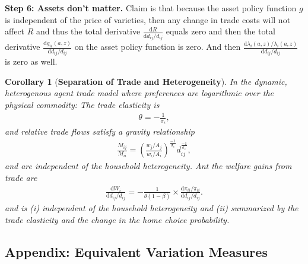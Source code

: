 \documentclass[12pt,pdftex]{article}
\newtheorem{corr}{Corollary}
\begin{document}
\begin{onehalfspacing}
\textbf{Step 6: Assets don't matter.} Claim is that because the asset policy function $g$ is independent of the price of varieties, then any change in trade costs will not affect $R$ and thus the total derivative $\frac{\mathrm{d} R}{\mathrm{d} d_{ij} / d_{ij}}$ equals zero and then the total derivative $\frac{\mathrm{d} g_{ii}(a,z)}{\mathrm{d} d_{ij} / d_{ij}}$ on the asset policy function is zero. And then $\frac{\mathrm{d} \lambda_{i}(a,z)/ \lambda_{i}(a,z)}{\mathrm{d} d_{ij} / d_{ij}}$ is zero as well.

\begin{corr}[\textbf{Separation of Trade and Heterogeneity}] In the dynamic, heterogenous agent trade model where preferences are logarithmic over the physical commodity: The trade elasticity is
\begin{align}
\theta = -\frac{1}{\sigma_{\epsilon}}, \nonumber
\end{align}
and relative trade flows satisfy a gravity relationship
\begin{align}
\frac{M_{ij}}{M_{ii}} = \left( \frac{  w_{j} / A_{j} }{  w_{i} / A_{i} } \right)^{\frac{-1}{\sigma_{\epsilon}}} d_{ij}^{\frac{-1}{\sigma_{\epsilon}}}, \nonumber
\end{align}
and are independent of the household heterogeneity. Ant the welfare gains from trade are
\begin{align}
\frac{\mathrm{d} W_{i}}{\mathrm{d} d_{ij} / d_{ij}} = -\frac{1}{\theta (1-\beta)} \times \frac{\mathrm{d} \pi_{ii} / \pi_{ii}}{\mathrm{d}d_{ij} / d_{ij}}. \nonumber
\end{align}
and is (i) independent of the household heterogeneity and (ii) summarized by the trade elasticity and the change in the home choice probability.
\end{corr}





\newpage






\subsection{Appendix: Equivalent Variation Measures}


\end{onehalfspacing}
\end{document}
